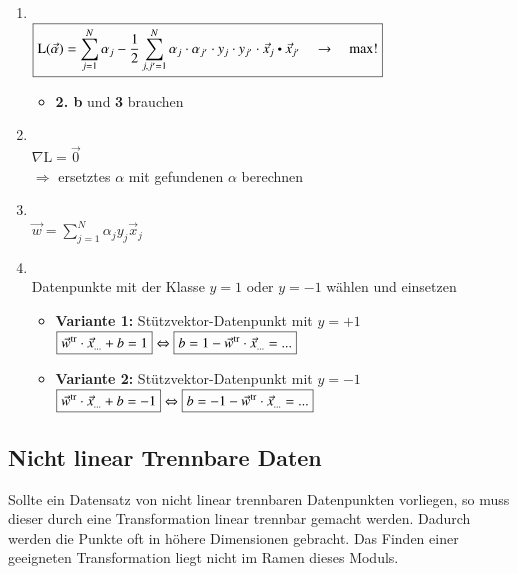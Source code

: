 \begin{enumerate}
    \item {}\\
        $\boxed{\mathrm{L}(\vec{\alpha})=\sum_{j=1}^N\alpha_j-\frac{1}{2}\sum_{j,j'=1}^N\alpha_j \cdot \alpha_{j'} \cdot \space y_j \cdot y_{j'} \cdot \space \vec{x}_j \dotp  \vec{x}_{j'}\quad\to\quad\max!}$
        \begin{itemize}
            \item \textbf{2. b} und \textbf{3} brauchen
        \end{itemize}
    \item {}\\
            $\boxed{\nabla \mathrm{L} = \vec{0}}$\\
            $\Rightarrow$ ersetztes $\alpha$ mit gefundenen $\alpha$ berechnen 
    \item {}\\
        $\boxed{\vec{w}=\sum_{j=1}^N\alpha_jy_j\vec{x}_j}$
    \item {}\\
        Datenpunkte mit der Klasse $y = 1$ oder $y = -1$ wählen und einsetzen
        \begin{itemize}
            \item \textbf{Variante 1:} Stützvektor-Datenpunkt mit $y = +1$\\
                $\boxed{\vec{w}^{\operatorname{tr}}\cdot\vec{x}_{...} + b = 1} \Leftrightarrow  \boxed{b = 1 -\vec{w}^{\operatorname{tr}}\cdot\vec{x}_{...} = ...}$
            \item \textbf{Variante 2:} Stützvektor-Datenpunkt mit $y = -1$\\
                $\boxed{\vec{w}^{\operatorname{tr}}\cdot\vec{x}_{...} + b = -1} \Leftrightarrow  \boxed{b = -1 -\vec{w}^{\operatorname{tr}}\cdot\vec{x}_{...} = ...}$
        \end{itemize}
\end{enumerate}


\subsection{Nicht linear Trennbare Daten}
Sollte ein Datensatz von nicht linear trennbaren Datenpunkten vorliegen, so muss dieser durch eine Transformation linear trennbar gemacht werden.
Dadurch werden die Punkte oft in höhere Dimensionen gebracht.
Das Finden einer geeigneten Transformation liegt nicht im Ramen dieses Moduls.

